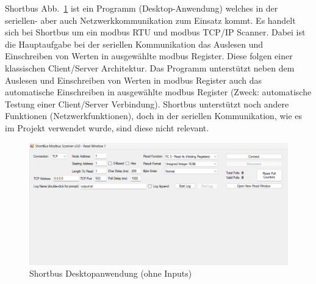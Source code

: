 Shortbus Abb.~\ref{fig:Shortbusfenster} ist ein Programm (Desktop-Anwendung) welches in der seriellen- aber auch Netzwerkkommunikation zum Einsatz kommt. 
Es handelt sich bei Shortbus um ein \gls{modbus} RTU und \gls{modbus} TCP/IP Scanner.
Dabei ist die Hauptaufgabe bei der seriellen Kommunikation das Auslesen und Einschreiben von Werten in ausgewählte \gls{modbus} Register. Diese folgen einer klassischen Client/Server Architektur.
Das Programm unterstützt neben dem Auslesen und Einschreiben von Werten in \gls{modbus} Register auch das  automatische Einschreiben in ausgewählte \gls{modbus} Register (Zweck: automatische Testung einer Client/Server Verbindung).
Shortbus unterstützt noch andere Funktionen (Netzwerkfunktionen), doch in der seriellen Kommunikation, wie es im Projekt verwendet wurde, sind diese nicht relevant.
\cite[vgl.][]{software.informer:2024}

\begin{figure}[H]
	\centering
	\includegraphics[width=1\linewidth]{Bilder/shortbus_fenster}
	\caption{Shortbus Desktopanwendung (ohne Inputs)} 
	\label{fig:Shortbusfenster}
\end{figure}

